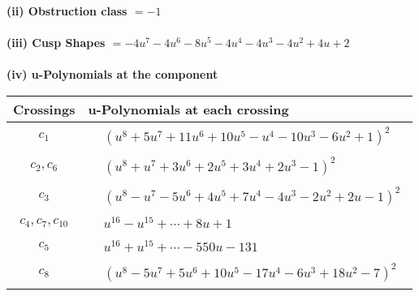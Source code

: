 \documentclass[1p]{elsarticle_modified}
\theoremstyle{definition}
\begin{document}
\flushleft \textbf{(ii) Obstruction class $= -1$}\\~\\
\flushleft \textbf{(iii) Cusp Shapes $= -4 u^7-4 u^6-8 u^5-4 u^4-4 u^3-4 u^2+4 u+2$}\\~\\
\newpage\renewcommand{\arraystretch}{1}
\flushleft \textbf{(iv) u-Polynomials at the component}\newline \\
\begin{tabular}{m{50pt}|m{274pt}}
Crossings & \hspace{64pt}u-Polynomials at each crossing \\
\hline $$\begin{aligned}c_{1}\end{aligned}$$&$\begin{aligned}
&(u^8+5 u^7+11 u^6+10 u^5- u^4-10 u^3-6 u^2+1)^2
\end{aligned}$\\
\hline $$\begin{aligned}c_{2},c_{6}\end{aligned}$$&$\begin{aligned}
&(u^8+u^7+3 u^6+2 u^5+3 u^4+2 u^3-1)^2
\end{aligned}$\\
\hline $$\begin{aligned}c_{3}\end{aligned}$$&$\begin{aligned}
&(u^8- u^7-5 u^6+4 u^5+7 u^4-4 u^3-2 u^2+2 u-1)^2
\end{aligned}$\\
\hline $$\begin{aligned}c_{4},c_{7},c_{10}\end{aligned}$$&$\begin{aligned}
&u^{16}- u^{15}+\cdots+8 u+1
\end{aligned}$\\
\hline $$\begin{aligned}c_{5}\end{aligned}$$&$\begin{aligned}
&u^{16}+u^{15}+\cdots-550 u-131
\end{aligned}$\\
\hline $$\begin{aligned}c_{8}\end{aligned}$$&$\begin{aligned}
&(u^8-5 u^7+5 u^6+10 u^5-17 u^4-6 u^3+18 u^2-7)^2
\end{aligned}$\\

\end{tabular}
\end{document}

